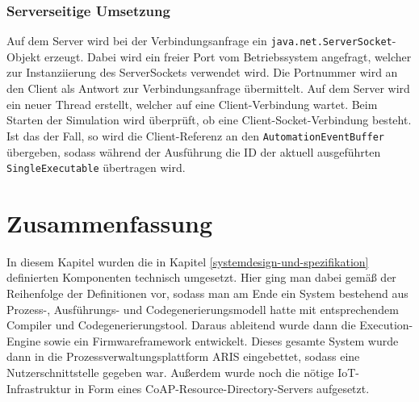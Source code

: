 \subsubsection{Serverseitige Umsetzung}

Auf dem Server wird bei der Verbindungsanfrage ein \texttt{java.net.ServerSocket}-Objekt erzeugt. Dabei wird ein freier Port vom Betriebssystem angefragt, welcher
zur Instanziierung des ServerSockets verwendet wird. Die Portnummer wird an den Client als Antwort zur Verbindungsanfrage übermittelt. Auf dem Server wird ein neuer Thread erstellt, welcher auf eine
Client-Verbindung wartet. Beim Starten der Simulation wird überprüft, ob eine Client-Socket-Verbindung besteht. Ist das der Fall, so wird die Client-Referenz an den
\texttt{AutomationEventBuffer} übergeben, sodass während der Ausführung die ID der aktuell ausgeführten \texttt{SingleExecutable} übertragen wird.

\section{Zusammenfassung}

In diesem Kapitel wurden die in Kapitel \ref{systemdesign-und-spezifikation} definierten Komponenten technisch umgesetzt. Hier ging man dabei gemäß der Reihenfolge der Definitionen vor,
sodass man am Ende ein System bestehend aus Prozess-, Ausführungs- und Codegenerierungsmodell hatte mit entsprechendem Compiler und Codegenerierungstool. Daraus ableitend wurde dann die Execution-Engine
sowie ein Firmwareframework entwickelt. Dieses gesamte System wurde dann in die Prozessverwaltungsplattform ARIS eingebettet, sodass eine Nutzerschnittstelle gegeben war. Außerdem wurde noch die nötige 
IoT-Infrastruktur in Form eines CoAP-Resource-Directory-Servers aufgesetzt.
